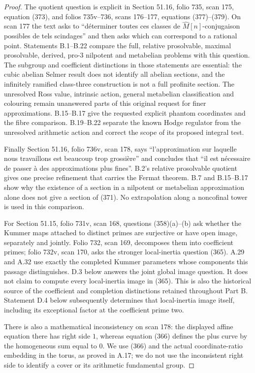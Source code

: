 \begin{proof}
The quotient question is explicit in Section 51.16, folio 735, scan 175,
equation (373), and folios 735v--736, scans 176--177, equations (377)--(379).
On scan 177 the text asks to ``d\'eterminer toutes ces classes de
$\widehat M[n]$-conjugaison possibles de tels scindages'' and then asks
which can correspond to a rational point. Statements B.1--B.22 compare
the full, relative prosolvable, maximal prosolvable, derived, pro-$3$
nilpotent and metabelian problems with this question. The subgroup and
coefficient distinctions in those statements are essential: the cubic
abelian Selmer result does not identify all abelian sections, and the
infinitely ramified class-three construction is not a full profinite
section. The unresolved Ross value, intrinsic action, general metabelian
classification and colouring remain unanswered parts of this original
request for finer approximations. B.15--B.17 give the requested explicit
phantom coordinates and the fibre comparison. B.19--B.22 separate the
known Hodge regulator from the unresolved arithmetic action and correct
the scope of its proposed integral test.

Finally Section 51.16, folio 736v, scan 178, says
``l'approximation sur laquelle nous travaillons est beaucoup trop
grossi\`ere'' and concludes that ``il est n\'ecessaire de passer \`a des
approximations plus fines''. B.2's relative prosolvable quotient gives one
precise refinement that carries the Fermat theorem. B.7 and B.15--B.17
show why the existence of a section in a nilpotent
or metabelian approximation alone does not give a section of (371).
No extrapolation along a noncofinal tower is used in this comparison.

For Section 51.15, folio 731v, scan 168, questions (358)(a)--(b) ask whether
the Kummer maps attached to distinct primes are surjective or have open
image, separately and jointly. Folio 732, scan 169, decomposes them into
coefficient primes; folio 732v, scan 170, asks the stronger local-inertia
question (365). A.29 and A.32 use exactly the completed Kummer parameters
whose components this passage distinguishes. D.3 below answers the joint
global image question. It does not claim to compute every local-inertia
image in (365). This is also the historical source of the coefficient and
completion distinctions retained throughout Part B.
Statement D.4 below subsequently determines that local-inertia image
itself, including its exceptional factor at the coefficient prime two.

There is also a mathematical inconsistency on scan 178: the displayed
affine equation there has right side $1$, whereas equation (366) defines
the plus curve by the homogeneous sum equal to $0$. We use (366) and
the actual coordinate-ratio embedding in the torus, as proved in A.17;
we do not use the inconsistent right side to identify a cover or its
arithmetic fundamental group.
\end{proof}

